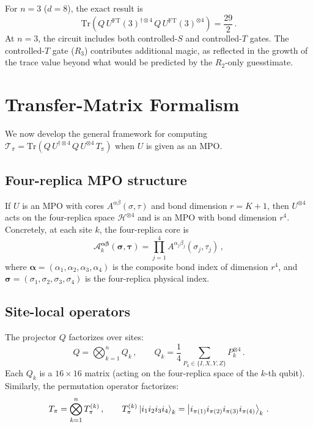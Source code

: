 \documentclass[11pt,a4paper]{article}
\theoremstyle{definition}
\theoremstyle{remark}
\newcommand{\HH}{\mathcal{H}}
\newcommand{\UFT}{U^{\mathrm{FT}}}
\renewcommand{\Tr}{\mathrm{Tr}}
\begin{document}
For $n=3$ ($d=8$), the exact result is
\begin{equation}
  \Tr(Q\,\UFT(3)^{\dagger\otimes 4}\,Q\,\UFT(3)^{\otimes 4}) = \frac{29}{2}\,.
\end{equation}
At $n=3$, the circuit includes both controlled-$S$ and controlled-$T$ gates. The controlled-$T$ gate ($R_3$) contributes additional magic, as reflected in the growth of the trace value beyond what would be predicted by the $R_2$-only guesstimate.

\section{Transfer-Matrix Formalism}
\label{sec:transfer}

We now develop the general framework for computing $\mathcal{T}_\pi = \Tr(Q\,U^{\dagger\otimes 4}\,Q\,U^{\otimes 4}\,T_\pi)$ when $U$ is given as an MPO.

\subsection{Four-replica MPO structure}

If $U$ is an MPO with cores $A^{\alpha\beta}(\sigma,\tau)$ and bond dimension $r=K+1$, then $U^{\otimes 4}$ acts on the four-replica space $\HH^{\otimes 4}$ and is an MPO with bond dimension $r^4$.  Concretely, at each site $k$, the four-replica core is
\begin{equation}\label{eq:4rep_core}
  \mathcal{A}^{\boldsymbol{\alpha}\boldsymbol{\beta}}_k
  (\boldsymbol{\sigma},\boldsymbol{\tau})
  = \prod_{j=1}^4 A^{\alpha_j\beta_j}(\sigma_j,\tau_j)\,,
\end{equation}
where $\boldsymbol{\alpha}=(\alpha_1,\alpha_2,\alpha_3,\alpha_4)$ is the composite bond index of dimension $r^4$, and $\boldsymbol{\sigma}=(\sigma_1,\sigma_2,\sigma_3,\sigma_4)$ is the four-replica physical index.

\subsection{Site-local operators}

The projector $Q$ factorizes over sites:
\begin{equation}\label{eq:Q_local}
  Q = \bigotimes_{k=1}^n Q_k\,,\qquad
  Q_k = \frac{1}{4}\sum_{P_k\in\{I,X,Y,Z\}} P_k^{\otimes 4}\,.
\end{equation}
Each $Q_k$ is a $16\times 16$ matrix (acting on the four-replica space of the $k$-th qubit).
Similarly, the permutation operator factorizes:
\begin{equation}
  T_\pi = \bigotimes_{k=1}^n T_\pi^{(k)}\,,\qquad
  T_\pi^{(k)}\ket{i_1 i_2 i_3 i_4}_k = \ket{i_{\pi(1)}i_{\pi(2)}i_{\pi(3)}i_{\pi(4)}}_k\,.
\end{equation}
\end{document}
